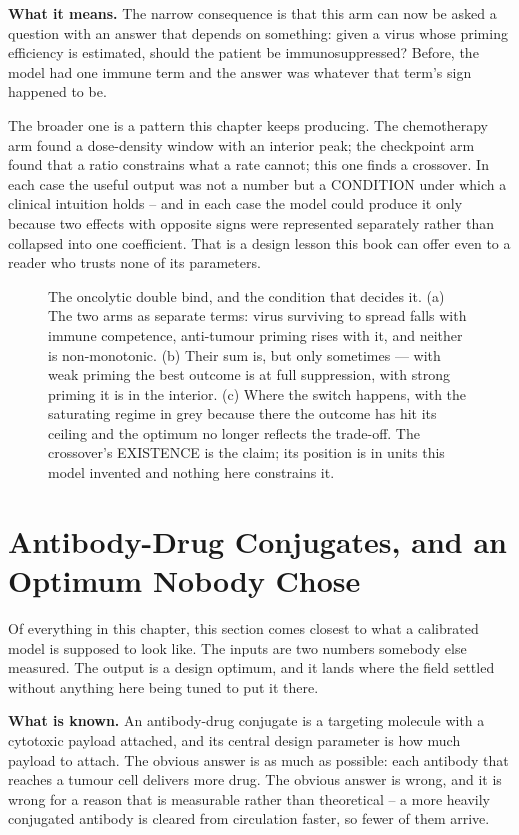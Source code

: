 \documentclass[11pt,twoside,openright]{report}
\begin{document}
\textbf{What it means.} The narrow consequence is that this arm can now be asked a question with an answer that depends on something: given a virus whose priming efficiency is estimated, should the patient be immunosuppressed? Before, the model had one immune term and the answer was whatever that term's sign happened to be.

The broader one is a pattern this chapter keeps producing. The chemotherapy arm found a dose-density window with an interior peak; the checkpoint arm found that a ratio constrains what a rate cannot; this one finds a crossover. In each case the useful output was not a number but a CONDITION under which a clinical intuition holds -- and in each case the model could produce it only because two effects with opposite signs were represented separately rather than collapsed into one coefficient. That is a design lesson this book can offer even to a reader who trusts none of its parameters.

\begin{figure}[tbp]
\setcounter{figure}{35}
\caption{The oncolytic double bind, and the condition that decides it. (a) The two arms as separate terms: virus surviving to spread falls with immune competence, anti-tumour priming rises with it, and neither is non-monotonic. (b) Their sum is, but only sometimes --- with weak priming the best outcome is at full suppression, with strong priming it is in the interior. (c) Where the switch happens, with the saturating regime in grey because there the outcome has hit its ceiling and the optimum no longer reflects the trade-off. The crossover's EXISTENCE is the claim; its position is in units this model invented and nothing here constrains it.}
\label{fig:fig40_oncolytic_bind}
\end{figure}

\section{Antibody-Drug Conjugates, and an Optimum Nobody Chose}

Of everything in this chapter, this section comes closest to what a calibrated model is supposed to look like. The inputs are two numbers somebody else measured. The output is a design optimum, and it lands where the field settled without anything here being tuned to put it there.

\textbf{What is known.} An antibody-drug conjugate is a targeting molecule with a cytotoxic payload attached, and its central design parameter is how much payload to attach. The obvious answer is as much as possible: each antibody that reaches a tumour cell delivers more drug. The obvious answer is wrong, and it is wrong for a reason that is measurable rather than theoretical -- a more heavily conjugated antibody is cleared from circulation faster, so fewer of them arrive.
\end{document}
